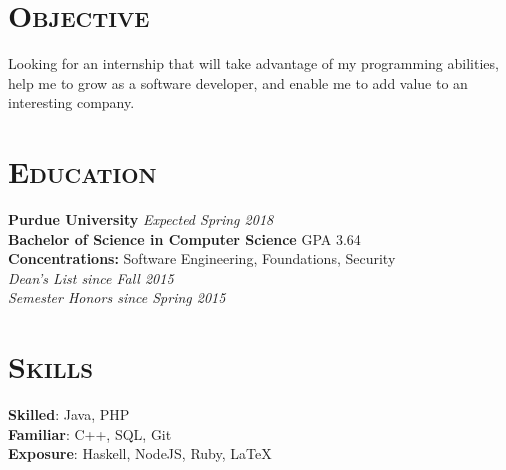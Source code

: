 
\hypersetup{backref,pdfpagemode=Full,colorlinks=true,backref}

\addtolength{\oddsidemargin}{-0.45in}
\addtolength{\voffset}{-0.20in}
\addtolength{\textwidth}{0.85in} 
\addtolength{\textheight}{1.00in}

\renewcommand{\namefont}{\LARGE\emph}




\address{ryndvs96@gmail.com \ \ \ \ \ github.com/ryndvs96}
\begin{resume}


\section{\textsc{Objective}}

Looking for an internship that will take advantage of my programming abilities, help me to grow as a software developer, and enable me to add value to an interesting company.


\section{\textsc{Education}}

\textbf{Purdue University} \hfill \emph{Expected Spring 2018} \\
\textbf{Bachelor of Science in Computer Science} \hfill GPA 3.64\\
\textbf{Concentrations:} Software Engineering, Foundations, Security\\
\emph{Dean's List since Fall 2015}\\
\emph{Semester Honors since Spring 2015}



\section{\textsc{Skills}}

\small{\textbf{Skilled}: }\normalsize{Java, PHP}\\
\small{\textbf{Familiar}: }\normalsize{C++, SQL, Git}\\
\small{\textbf{Exposure}: }\normalsize{Haskell, NodeJS, Ruby, \LaTeX}


\end{resume}
